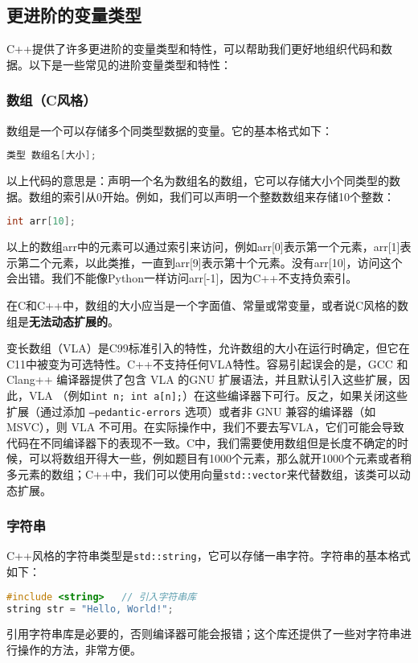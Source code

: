 \subsection{更进阶的变量类型}
C++提供了许多更进阶的变量类型和特性，可以帮助我们更好地组织代码和数据。以下是一些常见的进阶变量类型和特性：
\subsubsection{数组（C风格）}

数组是一个可以存储多个同类型数据的变量。它的基本格式如下：
\begin{lstlisting}[language=C++]
类型 数组名[大小];
\end{lstlisting}
以上代码的意思是：声明一个名为数组名的数组，它可以存储大小个同类型的数据。数组的索引从0开始。例如，我们可以声明一个整数数组来存储10个整数：
\begin{lstlisting}[language=C++]
int arr[10];
\end{lstlisting}
以上的数组arr中的元素可以通过索引来访问，例如arr[0]表示第一个元素，arr[1]表示第二个元素，以此类推，一直到arr[9]表示第十个元素。没有arr[10]，访问这个会出错。我们不能像Python一样访问arr[-1]，因为C++不支持负索引。

在C和C++中，数组的大小应当是一个字面值、常量或常变量，或者说C风格的数组是\textbf{无法动态扩展的}。

\begin{caution}
  变长数组（VLA）是C99标准引入的特性，允许数组的大小在运行时确定，但它在C11中被变为可选特性。C++不支持任何VLA特性。容易引起误会的是，GCC 和 Clang++ 编译器提供了包含 VLA 的GNU 扩展语法，并且默认引入这些扩展，因此，VLA （例如\texttt{int n; int a[n];}）在这些编译器下可行。反之，如果关闭这些扩展（通过添加 \texttt{--pedantic-errors} 选项）或者非 GNU 兼容的编译器（如 MSVC），则 VLA 不可用。在实际操作中，我们不要去写VLA，它们可能会导致代码在不同编译器下的表现不一致。C中，我们需要使用数组但是长度不确定的时候，可以将数组开得大一些，例如题目有1000个元素，那么就开1000个元素或者稍多元素的数组；C++中，我们可以使用向量\texttt{std::vector}来代替数组，该类可以动态扩展。
\end{caution}

\subsubsection{字符串}
C++风格的字符串类型是\texttt{std::string}，它可以存储一串字符。字符串的基本格式如下：
\begin{lstlisting}[language=C++]
#include <string>   // 引入字符串库
string str = "Hello, World!";
\end{lstlisting}
引用字符串库是必要的，否则编译器可能会报错；这个库还提供了一些对字符串进行操作的方法，非常方便。


